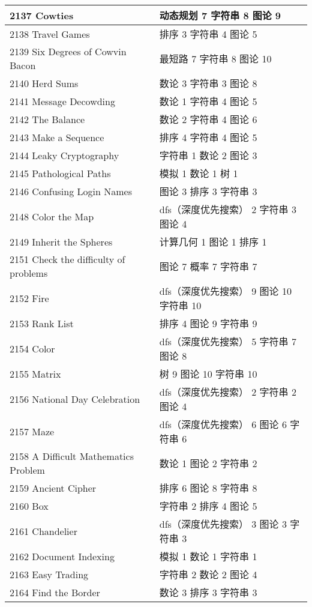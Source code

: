 \begin{longtable}{| p{} | p{} |}
 2137 Cowties  & 动态规划 7 字符串 8 图论 9 \\ \hline
 2138 Travel Games  & 排序 3 字符串 4 图论 5 \\ \hline
 2139 Six Degrees of Cowvin Bacon  & 最短路 7 字符串 8 图论 10 \\ \hline
 2140 Herd Sums  & 数论 3 字符串 3 图论 8 \\ \hline
 2141 Message Decowding  & 数论 1 字符串 4 图论 5 \\ \hline
 2142 The Balance  & 数论 2 字符串 4 图论 6 \\ \hline
 2143 Make a Sequence  & 排序 4 字符串 4 图论 5 \\ \hline
 2144 Leaky Cryptography  & 字符串 1 数论 2 图论 3 \\ \hline
 2145 Pathological Paths  & 模拟 1 数论 1 树 1 \\ \hline
 2146 Confusing Login Names  & 图论 3 排序 3 字符串 3 \\ \hline
 2148 Color the Map  & dfs（深度优先搜索） 2 字符串 3 图论 4 \\ \hline
 2149 Inherit the Spheres  & 计算几何 1 图论 1 排序 1 \\ \hline
 2151 Check the difficulty of problems  & 图论 7 概率 7 字符串 7 \\ \hline
 2152 Fire  & dfs（深度优先搜索） 9 图论 10 字符串 10 \\ \hline
 2153 Rank List  & 排序 4 图论 9 字符串 9 \\ \hline
 2154 Color  & dfs（深度优先搜索） 5 字符串 7 图论 8 \\ \hline
 2155 Matrix  & 树 9 图论 10 字符串 10 \\ \hline
 2156 National Day Celebration  & dfs（深度优先搜索） 2 字符串 2 图论 4 \\ \hline
 2157 Maze  & dfs（深度优先搜索） 6 图论 6 字符串 6 \\ \hline
 2158 A Difficult Mathematics Problem  & 数论 1 图论 2 字符串 2 \\ \hline
 2159 Ancient Cipher  & 排序 6 图论 8 字符串 8 \\ \hline
 2160 Box  & 字符串 2 排序 4 图论 5 \\ \hline
 2161 Chandelier  & dfs（深度优先搜索） 3 图论 3 字符串 3 \\ \hline
 2162 Document Indexing  & 模拟 1 数论 1 字符串 1 \\ \hline
 2163 Easy Trading  & 字符串 2 数论 2 图论 4 \\ \hline
 2164 Find the Border  & 数论 3 排序 3 字符串 3 \\ \hline

\end{longtable}
